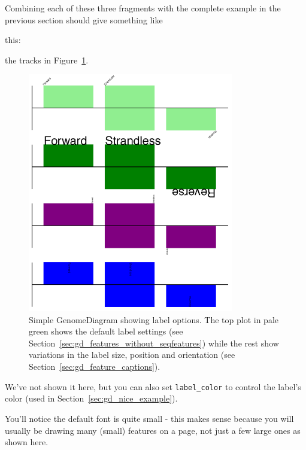 \documentclass{report}
\begin{document}
\noindent Combining each of these three fragments with the complete example
in the previous section should give something like
\begin{htmlonly}
this:

\label{fig:gd_sigil_labels}

\end{htmlonly}
\begin{latexonly}
the tracks in Figure~\ref{fig:gd_sigil_labels}.
\begin{figure}[htbp]
\centering
\includegraphics[width=0.8\textwidth]{images/GD_sigil_labels.png}
\caption{Simple GenomeDiagram showing label options.
The top plot in pale green shows the default label settings (see
Section~\ref{sec:gd_features_without_seqfeatures}) while the rest show
variations in the label size, position and orientation (see
Section~\ref{sec:gd_feature_captions}).
}
\label{fig:gd_sigil_labels}
\end{figure}
\end{latexonly}

We've not shown it here, but you can also set \texttt{label\_color} to
control the label's color (used in Section~\ref{sec:gd_nice_example}).

You'll notice the default font is quite small - this makes sense because
you will usually be drawing many (small) features on a page, not just a
few large ones as shown here.
\end{document}
